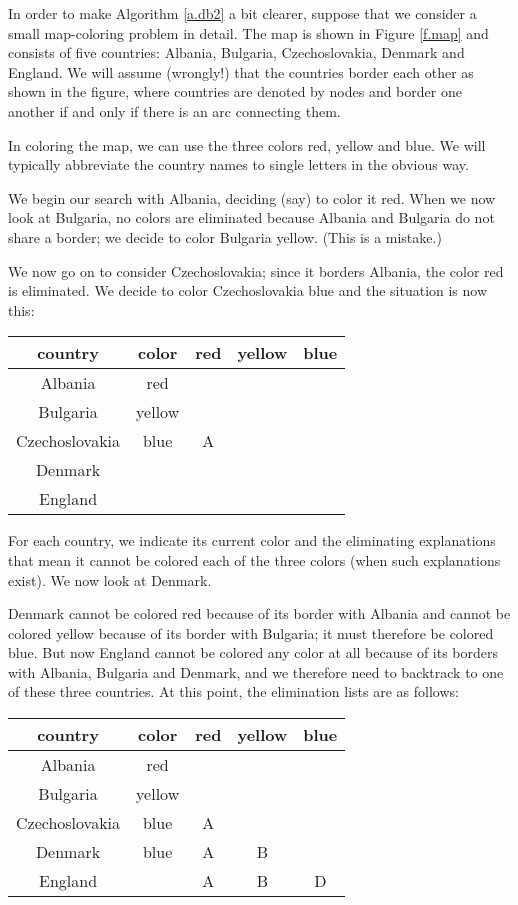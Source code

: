 In order to make Algorithm \ref{a.db2} a bit clearer, suppose that we
consider a small map-coloring problem in detail.  The map is shown in
Figure \ref{f.map} and consists of five countries: Albania, Bulgaria,
Czechoslovakia, Denmark and England.  We will assume (wrongly!) that
the countries border each other as shown in the figure, where
countries are denoted by nodes and border one another if and only if
there is an arc connecting them.

In coloring the map, we can use the three colors red, yellow and blue.
We will typically abbreviate the country names to single letters in
the obvious way.

We begin our search with Albania, deciding (say) to color it red.
When we now look at Bulgaria, no colors are eliminated because Albania
and Bulgaria do not share a border; we decide to color Bulgaria yellow.
(This is a mistake.)

We now go on to consider Czechoslovakia; since it borders Albania, the
color red is eliminated.  We decide to color Czechoslovakia blue and
the situation is now this:
 \begin{center}
 \begin{tabular}{c||c||c|c|c}
country & color & red & yellow & blue \\
\hline
Albania & red &&& \\
Bulgaria & yellow &&& \\
Czechoslovakia & blue & A && \\
Denmark &&&& \\
England &&&&
 \end{tabular}
 \end{center}
 For each country, we indicate its current color and the eliminating
explanations that mean it cannot be colored each of the three colors
(when such explanations exist).  We now look at Denmark.

Denmark cannot be colored red because of its border with Albania and
cannot be colored yellow because of its border with Bulgaria; it must
therefore be colored blue.  But now England cannot be colored any
color at all because of its borders with Albania, Bulgaria and
Denmark, and we therefore need to backtrack to one of these three
countries.  At this point, the elimination lists are as follows:
 \begin{center}
 \begin{tabular}{c||c||c|c|c}
country & color & red & yellow & blue \\
\hline
Albania & red &&& \\
Bulgaria & yellow &&& \\
Czechoslovakia & blue & A && \\
Denmark & blue & A & B & \\
England && A & B & D
 \end{tabular}
 \end{center}

